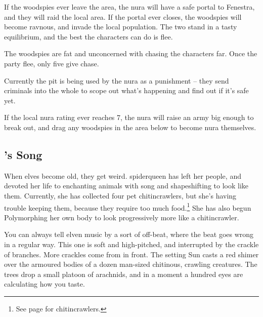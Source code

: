 \begin{multicols}{2}
\begin{boxtext}
\end{boxtext}

If the woodspies ever leave the area, the nura will have a safe portal to Fenestra, and they will raid the local area.
If the portal ever closes, the woodspies will become ravnous, and invade the local population.
The two stand in a tasty equilibrium, and the best the characters can do is flee.

The woodspies are fat and unconcerned with chasing the characters far.  Once the party flee, only five give chase.


\woodspy

Currently the pit is being used by the nura as a punishment -- they send criminals into the whole to scope out what's happening and find out if it's safe yet.

If the local nura rating ever reaches 7, the nura will raise an army big enough to break out, and drag any woodspies in the area below to become nura themselves.


\nurawoodspy

\subsection[\Glsentrytext{spiderqueen}'s Song]{'s Song}

When elves become old, they get weird.  \Gls{spiderqueen} has left her people, and devoted her life to enchanting animals with song and shapeshifting to look like them.  Currently, she has collected four pet chitincrawlers, but she's having trouble keeping them, because they require too much food.\footnote{See page \pageref{chitincrawler} for chitincrawlers.}
She has also begun Polymorphing her own body to look progressively more like a chitincrawler.

\label{spiderqueenssong}

\begin{boxtext}

	You can always tell elven music by a sort of off-beat, where the beat goes wrong in a regular way.  This one is soft and high-pitched, and interrupted by the crackle of branches.  More crackles come from in front.  The setting Sun casts a red shimer over the armoured bodies of a dozen man-sized chitinous, crawling creatures.  The trees drop a small platoon of arachnids, and in a moment a hundred eyes are calculating how you taste.


\end{boxtext}
\end{multicols}
